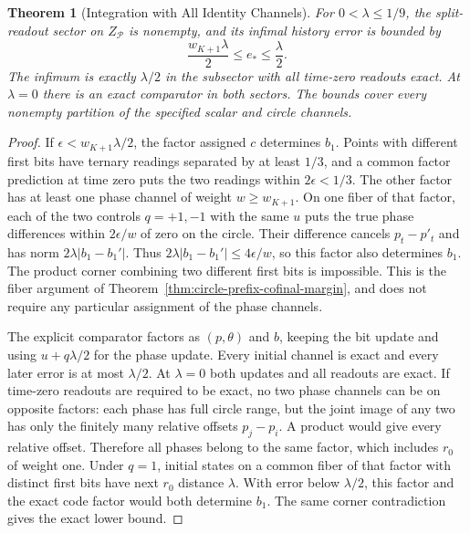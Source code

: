 \documentclass[11pt,a4paper]{article}
\newtheorem{theorem}{Theorem}[section]
\theoremstyle{definition}
\begin{document}
\begin{theorem}[Integration with All Identity Channels]\label{thm:integration-all-identity-channels}
For $0<\lambda\le1/9$, the split-readout sector on $Z_{\mathcal P}$ is nonempty, and its infimal history error is bounded by
\[
 \frac{w_{K+1}\lambda}{2}\le e_\ast\le\frac{\lambda}{2}.
\]
The infimum is exactly $\lambda/2$ in the subsector with all time-zero readouts exact. At $\lambda=0$ there is an exact comparator in both sectors. The bounds cover every nonempty partition of the specified scalar and circle channels.
\end{theorem}

\begin{proof}
If $\epsilon<w_{K+1}\lambda/2$, the factor assigned $c$ determines $b_1$. Points with different first bits have ternary readings separated by at least $1/3$, and a common factor prediction at time zero puts the two readings within $2\epsilon<1/3$. The other factor has at least one phase channel of weight $w\ge w_{K+1}$. On one fiber of that factor, each of the two controls $q=+1,-1$ with the same $u$ puts the true phase differences within $2\epsilon/w$ of zero on the circle. Their difference cancels $p_t-p'_t$ and has norm $2\lambda|b_1-b_1'|$. Thus $2\lambda|b_1-b_1'|\le4\epsilon/w$, so this factor also determines $b_1$. The product corner combining two different first bits is impossible. This is the fiber argument of Theorem~\ref{thm:circle-prefix-cofinal-margin}, and does not require any particular assignment of the phase channels.

The explicit comparator factors as $(p,\theta)$ and $b$, keeping the bit update and using $u+q\lambda/2$ for the phase update. Every initial channel is exact and every later error is at most $\lambda/2$. At $\lambda=0$ both updates and all readouts are exact. If time-zero readouts are required to be exact, no two phase channels can be on opposite factors: each phase has full circle range, but the joint image of any two has only the finitely many relative offsets $p_j-p_i$. A product would give every relative offset. Therefore all phases belong to the same factor, which includes $r_0$ of weight one. Under $q=1$, initial states on a common fiber of that factor with distinct first bits have next $r_0$ distance $\lambda$. With error below $\lambda/2$, this factor and the exact code factor would both determine $b_1$. The same corner contradiction gives the exact lower bound.
\end{proof}
\end{document}
